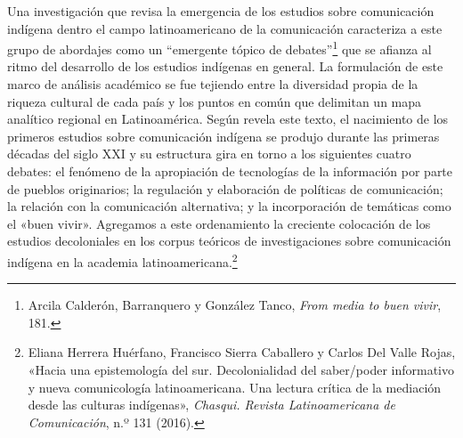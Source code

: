 \documentclass{tufte-handout}
\begin{document}
Una investigación que revisa la emergencia de los estudios sobre
comunicación indígena dentro el campo latinoamericano de la comunicación
caracteriza a este grupo de abordajes como un ``emergente tópico de
debates''\footnote{Arcila Calderón, Barranquero y González Tanco,
  \emph{From media to buen vivir}, 181.} que se afianza al ritmo del
desarrollo de los estudios indígenas en general. La formulación de este
marco de análisis académico se fue tejiendo entre la diversidad propia
de la riqueza cultural de cada país y los puntos en común que delimitan
un mapa analítico regional en Latinoamérica. Según revela este texto, el
nacimiento de los primeros estudios sobre comunicación indígena se
produjo durante las primeras décadas del siglo XXI y su estructura gira
en torno a los siguientes cuatro debates: el fenómeno de la apropiación
de tecnologías de la información por parte de pueblos originarios; la
regulación y elaboración de políticas de comunicación; la relación con
la comunicación alternativa; y la incorporación de temáticas como el
«buen vivir». Agregamos a este ordenamiento la creciente colocación de
los estudios decoloniales en los corpus teóricos de investigaciones
sobre comunicación indígena en la academia latinoamericana.\footnote{Eliana
  Herrera Huérfano, Francisco Sierra Caballero y Carlos Del Valle Rojas,
  «Hacia una epistemología del sur. Decolonialidad del saber/poder
  informativo y nueva comunicología latinoamericana. Una lectura crítica
  de la mediación desde las culturas indígenas», \emph{Chasqui. Revista
  Latinoamericana de Comunicación}, n.º 131 (2016).}
\end{document}
